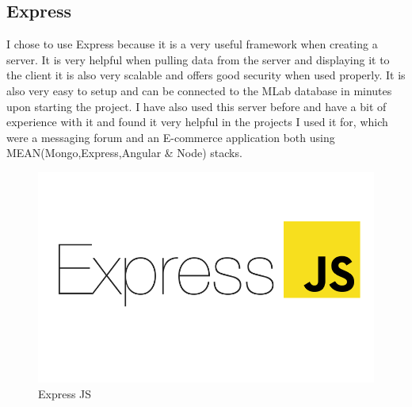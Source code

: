 \subsection{Express}
I chose to use Express because it is a very useful framework when creating a server.
It is very helpful when pulling data from the server and displaying it to the client
it is also very scalable and offers good security when used properly.  It is also very
easy to setup and can be connected to the MLab database in minutes upon starting the
project.  I have also used this server before and have a bit of experience with it and
found it very helpful in the projects I used it for, which were a messaging forum and an
E-commerce application both using MEAN(Mongo,Express,Angular \& Node) stacks.
\begin{figure}[H]
  \includegraphics[width=\textwidth]{img/express.png}
  \caption{Express JS}
  \label{fig: Image of Express Logo}
\end{figure}
\cite{ExpressImage}
\\
